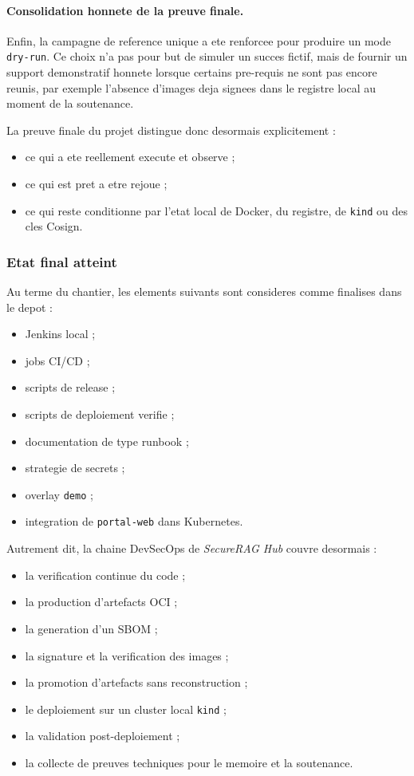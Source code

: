 \paragraph{Consolidation honnete de la preuve finale.}
Enfin, la campagne de reference unique a ete renforcee pour produire un mode \texttt{dry-run}. Ce choix n'a pas pour but de simuler un succes fictif, mais de fournir un support demonstratif honnete lorsque certains pre-requis ne sont pas encore reunis, par exemple l'absence d'images deja signees dans le registre local au moment de la soutenance.

La preuve finale du projet distingue donc desormais explicitement :

\begin{itemize}
  \item ce qui a ete reellement execute et observe ;
  \item ce qui est pret a etre rejoue ;
  \item ce qui reste conditionne par l'etat local de Docker, du registre, de \texttt{kind} ou des cles Cosign.
\end{itemize}

\subsubsection{Etat final atteint}

Au terme du chantier, les elements suivants sont consideres comme finalises dans le depot :

\begin{itemize}
  \item Jenkins local ;
  \item jobs CI/CD ;
  \item scripts de release ;
  \item scripts de deploiement verifie ;
  \item documentation de type runbook ;
  \item strategie de secrets ;
  \item overlay \texttt{demo} ;
  \item integration de \texttt{portal-web} dans Kubernetes.
\end{itemize}

Autrement dit, la chaine DevSecOps de \textit{SecureRAG Hub} couvre desormais :

\begin{itemize}
  \item la verification continue du code ;
  \item la production d'artefacts OCI ;
  \item la generation d'un SBOM ;
  \item la signature et la verification des images ;
  \item la promotion d'artefacts sans reconstruction ;
  \item le deploiement sur un cluster local \texttt{kind} ;
  \item la validation post-deploiement ;
  \item la collecte de preuves techniques pour le memoire et la soutenance.
\end{itemize}

